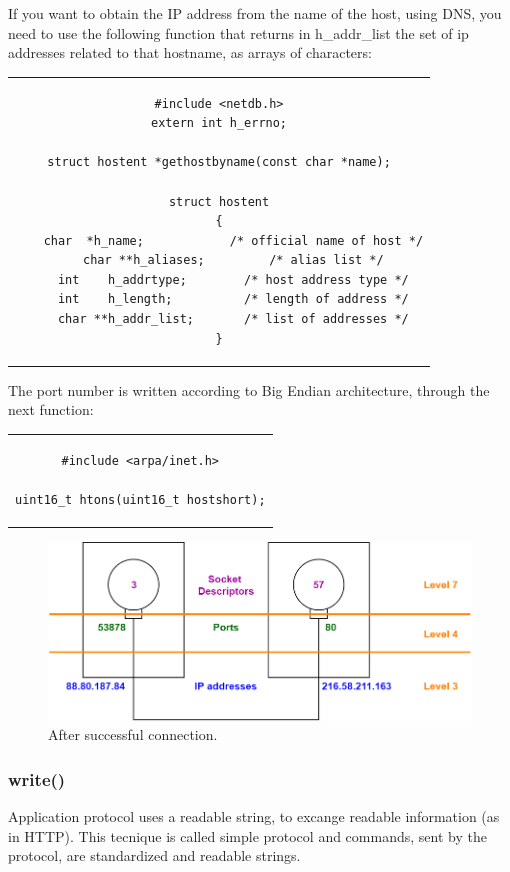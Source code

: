 If you want to obtain the IP address from the name of the host, using DNS, you need to use the following function that returns in h\_addr\_list the set of ip addresses related to that hostname, as arrays of characters:
\begin{center}
\begin{tabular}{c}
\begin{lstlisting}[linewidth=300pt, basicstyle=\footnotesize\sffamily,]
#include <netdb.h>
extern int h_errno;

struct hostent *gethostbyname(const char *name);

struct hostent
{
    char  *h_name;            /* official name of host */
    char **h_aliases;         /* alias list */
    int    h_addrtype;        /* host address type */
    int    h_length;          /* length of address */
    char **h_addr_list;       /* list of addresses */
}
\end{lstlisting}
\end{tabular}
\end{center}

The port number is written according to Big Endian architecture, through the next function:
\begin{center}
\begin{tabular}{c}
\begin{lstlisting}[linewidth=200pt, basicstyle=\footnotesize\sffamily,]
#include <arpa/inet.h>

uint16_t htons(uint16_t hostshort);
\end{lstlisting}
\end{tabular}
\end{center}
\begin{figure}[H]
\centering
\includegraphics[scale=0.4]{Images/NetworkC/addresses}\caption{\footnotesize{After successful connection.}}\label{addresses}
\end{figure}

\subsubsection{write()}
Application protocol uses a readable string, to excange readable information (as in HTTP). This tecnique is called simple protocol and commands, sent by the protocol, are standardized and readable strings.  

